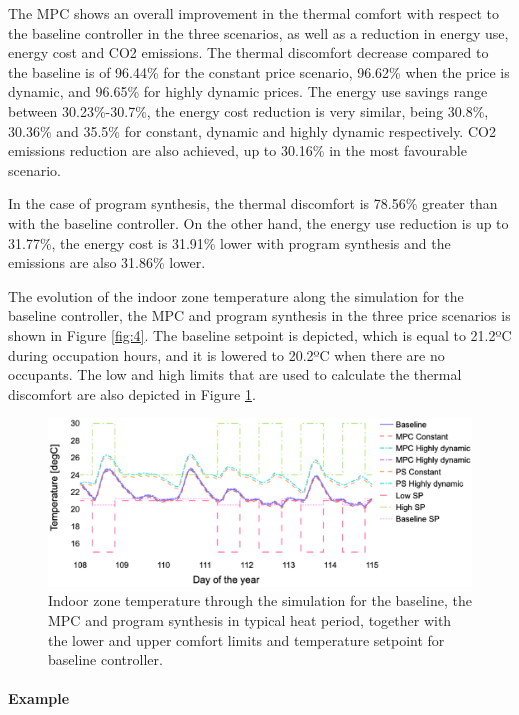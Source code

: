 The MPC shows an overall improvement in the thermal comfort with respect to the baseline controller in the three scenarios, as well as a reduction in energy use, energy cost and CO2 emissions. The thermal discomfort decrease compared to the baseline is of 96.44\% for the constant price scenario, 96.62\% when the price is dynamic, and 96.65\% for highly dynamic prices. The energy use savings range between 30.23\%-30.7\%, the energy cost reduction is very similar, being 30.8\%, 30.36\% and 35.5\% for constant, dynamic and highly dynamic respectively. CO2 emissions reduction are also achieved, up to 30.16\% in the most favourable scenario.

In the case of program synthesis, the thermal discomfort is 78.56\% greater than with the baseline controller. On the other hand, the energy use reduction is up to 31.77\%, the energy cost is 31.91\% lower with program synthesis and the emissions are also 31.86\% lower.

The evolution of the indoor zone temperature along the simulation for the baseline controller, the MPC and program synthesis in the three price scenarios is shown in Figure \ref{fig:4}. The baseline setpoint is depicted, which is equal to 21.2ºC during occupation hours, and it is lowered to 20.2ºC when there are no occupants. The low and high limits that are used to calculate the thermal discomfort are also depicted in Figure \ref{fig:7}.

\begin{figure}[H]
  \includegraphics[scale=.4]{images/boptest/Fig7.eps}
\caption{Indoor zone temperature through the simulation for the baseline, the MPC and program synthesis in typical heat period, together with the lower and upper comfort limits and temperature setpoint for baseline controller.}
\label{fig:7}       %
\end{figure}

\paragraph{Example}

